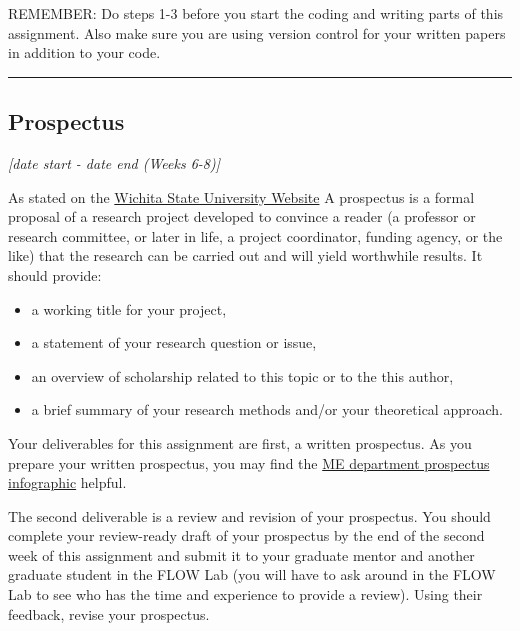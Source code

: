 \documentclass[12pt]{article}
\begin{document}
\noindent REMEMBER: Do steps 1-3 before you start the coding and writing parts of this assignment. Also make sure you are using version control for your written papers in addition to your code.


\vspace{1em}\hrule\vspace{1em}
\subsection{Prospectus}
\label{ssec:prospectus}
\textit{[date start - date end (Weeks 6-8)]}

\bigskip

As stated on the \href{https://www.wichita.edu/academics/fairmount_college_of_liberal_arts_and_sciences/english/deptenglish/WritingaResearchProspectus.php#:~:text=A%20prospectus%20is%20a%20formal,and%20will%20yield%20worthwhile%20results.}{Wichita State University Website}
A prospectus is a formal proposal of a research project developed to convince a reader (a professor or research committee, or later in life, a project coordinator, funding agency, or the like) that the research can be carried out and will yield worthwhile results. It should provide:

\begin{itemize}
	\item a working title for your project,
	\item a statement of your research question or issue,
	\item an overview of scholarship related to this topic or to the this author,
	\item a brief summary of your research methods and/or your theoretical approach.
\end{itemize}

Your deliverables for this assignment are first, a written prospectus.
As you prepare your written prospectus, you may find the \href{https://www.me.byu.edu/00000177-4afb-d009-abf7-ebff31d50000/prospectus-outline-pdf-pdf}{ME department prospectus infographic} helpful.

The second deliverable is a review and revision of your prospectus.
You should complete your review-ready draft of your prospectus by the end of the second week of this assignment and submit it to your graduate mentor and another graduate student in the FLOW Lab (you will have to ask around in the FLOW Lab to see who has the time and experience to provide a review).
Using their feedback, revise your prospectus.
\end{document}
